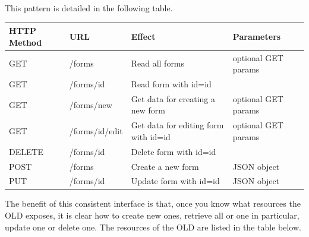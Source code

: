 \documentclass[letterpaper,10pt,english]{sphinxmanual}
\begin{document}
This pattern is detailed in the following table.

\begin{tabulary}{\linewidth}{|L|L|L|L|}
\hline
\textbf{
HTTP Method
} & \textbf{
URL
} & \textbf{
Effect
} & \textbf{
Parameters
}\\\hline

GET
 & 
/forms
 & 
Read all forms
 & 
optional GET params
\\\hline

GET
 & 
/forms/id
 & 
Read form with id=id
 & \\\hline

GET
 & 
/forms/new
 & 
Get data for creating a new form
 & 
optional GET params
\\\hline

GET
 & 
/forms/id/edit
 & 
Get data for editing form with id=id
 & 
optional GET params
\\\hline

DELETE
 & 
/forms/id
 & 
Delete form with id=id
 & \\\hline

POST
 & 
/forms
 & 
Create a new form
 & 
JSON object
\\\hline

PUT
 & 
/forms/id
 & 
Update form with id=id
 & 
JSON object
\\\hline
\end{tabulary}


The benefit of this consistent interface is that, once you know what resources
the OLD exposes, it is clear how to create new ones, retrieve all or one in
particular, update one or delete one.  The resources of the OLD are listed
in the table below.
\end{document}
